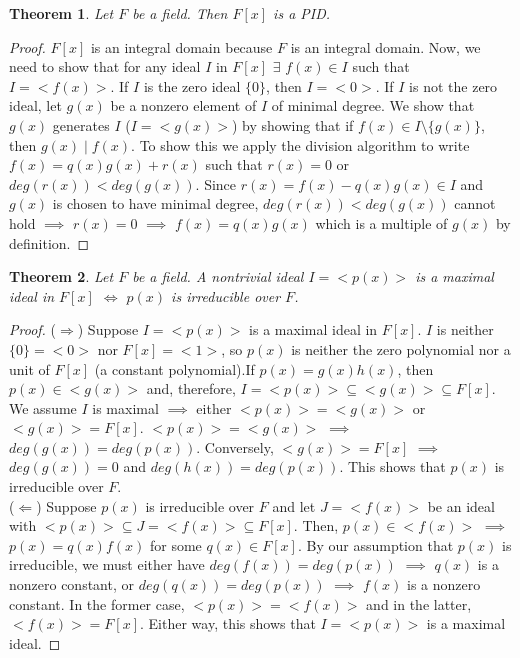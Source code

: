 \documentclass[11pt]{article}
\newtheorem{thm}{Theorem}[section]
\theoremstyle{definition}
\numberwithin{equation}{section}
\begin{document}
\begin{thm}
Let $F$ be a field. Then $F[x]$ is a PID.
\end{thm}

\begin{proof}
$F[x]$ is an integral domain because $F$ is an integral domain. Now, we need to show that for any ideal $I$ in $F[x]$ $\exists$ $f(x) \in I$ such that $I = <f(x)>$. If $I$ is the zero ideal $\{0\}$, then $I = <0>$. If $I$ is not the zero ideal, let $g(x)$ be a nonzero element of $I$ of minimal degree. We show that $g(x)$ generates $I$ ($I = <g(x)>$) by showing that if $f(x) \in I \setminus \{g(x)\}$, then $g(x) \mid f(x)$. To show this we apply the division algorithm to write $f(x)=q(x)g(x)+r(x)$ such that $r(x)=0$ or $deg(r(x))<deg(g(x))$. Since $r(x) = f(x) - q(x)g(x) \in I$ and $g(x)$ is chosen to have minimal degree, $deg(r(x))<deg(g(x))$ cannot hold $\implies$ $r(x) = 0$ $\implies$ $f(x) = q(x)g(x)$ which is a multiple of $g(x)$ by definition.
\end{proof}

\begin{thm}
Let $F$ be a field. A nontrivial ideal $I = <p(x)>$ is a maximal ideal in $F[x]$ $\Longleftrightarrow$ $p(x)$ is irreducible over $F$.
\end{thm}

\begin{proof}
($\Rightarrow$) Suppose $I = <p(x)>$ is a maximal ideal in $F[x]$. $I$ is neither $\{0\}=<0>$ nor $F[x] = <1>$, so $p(x)$ is neither the zero polynomial nor a unit of $F[x]$ (a constant polynomial).If $p(x) = g(x)h(x)$, then $p(x) \in <g(x)>$ and, therefore, $I = <p(x)> \subseteq <g(x)> \subseteq F[x]$. We assume $I$ is maximal $\implies$ either $<p(x)> = <g(x)>$ or $<g(x)>=F[x]$. $<p(x)> = <g(x)>$ $\implies$ $deg(g(x)) = deg(p(x))$. Conversely, $<g(x)>=F[x]$ $\implies$ $deg(g(x)) = 0$ and $deg(h(x)) = deg(p(x))$. This shows that $p(x)$ is irreducible over $F$.\\
($\Leftarrow$) Suppose $p(x)$ is irreducible over $F$ and let $J = <f(x)>$ be an ideal with $<p(x)> \subseteq J = <f(x)> \subseteq F[x]$. Then, $p(x) \in <f(x)>$ $\implies$ $p(x) = q(x)f(x)$ for some $q(x) \in F[x]$. By our assumption that $p(x)$ is irreducible, we must either have $deg(f(x)) = deg(p(x))$ $\implies$ $q(x)$ is a nonzero constant, or $deg(q(x)) = deg(p(x))$ $\implies$ $f(x)$ is a nonzero constant. In the former case, $<p(x)> = <f(x)>$ and in the latter, $<f(x)> = F[x]$. Either way, this shows that $I = <p(x)>$ is a maximal ideal.
\end{proof}
\end{document}
